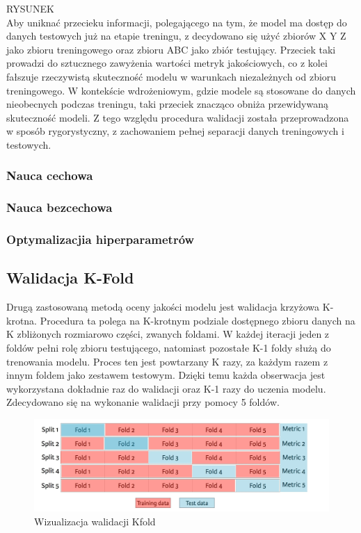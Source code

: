 \documentclass[a4paper,twoside,12pt]{book}
\begin{document}
{\LARGE
RYSUNEK}\\

Aby uniknać przecieku informacji, polegającego na tym, że model ma dostęp do danych testowych już na etapie treningu, z decydowano się użyć zbiorów X Y Z jako zbioru treningowego oraz zbioru ABC jako zbiór testujący. Przeciek taki prowadzi do sztucznego zawyżenia wartości metryk jakościowych, co z kolei fałszuje rzeczywistą skuteczność modelu w warunkach niezależnych od zbioru treningowego. W kontekście wdrożeniowym, gdzie modele są stosowane do danych nieobecnych podczas treningu, taki przeciek znacząco obniża przewidywaną skuteczność modeli. Z tego względu procedura walidacji została przeprowadzona w sposób rygorystyczny, z zachowaniem pełnej separacji danych treningowych i testowych.


\subsubsection*{Nauca cechowa}
\subsubsection*{Nauca bezcechowa}
\subsubsection*{Optymalizacjia hiperparametrów}
\newpage
\subsection{Walidacja K-Fold}
Drugą zastosowaną metodą oceny jakości modelu jest walidacja krzyżowa K-krotna. Procedura ta polega na K-krotnym podziale dostępnego zbioru danych na K zbliżonych rozmiarowo części, zwanych foldami. W każdej iteracji jeden z foldów pełni rolę zbioru testującego, natomiast pozostałe K-1 foldy służą do trenowania modelu. Proces ten jest powtarzany K razy, za każdym razem z innym foldem jako zestawem testowym. Dzięki temu każda obserwacja jest wykorzystana dokładnie raz do walidacji oraz K-1 razy do uczenia modelu. Zdecydowano się na wykonanie walidacji przy pomocy 5 foldów.\\

\begin{figure}[!h]
	\centering
	\includegraphics[width=1\textwidth]{img/r5/kfold.jpg}
	\caption{Wizualizacja walidacji Kfold\cite{allibhai2018holdout}}
	\label{fig:etykieta-rysunku}
\end{figure}
\end{document}
